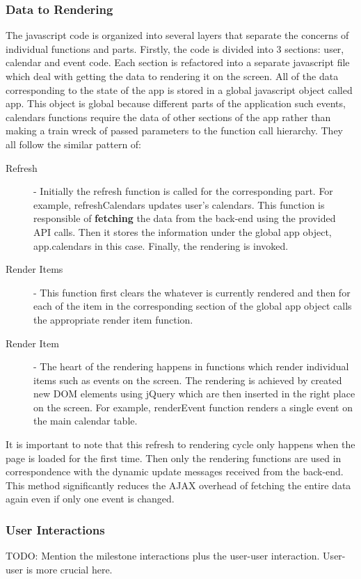 \documentclass[10pt,a4paper]{article}
\begin{document}
\subsubsection{Data to Rendering}
The javascript code is organized into several layers that separate the concerns of individual functions and parts. Firstly, the code is divided into 3 sections: user, calendar and event code. Each section is refactored into a separate javascript file which deal with getting the data to rendering it on the screen. All of the data corresponding to the state of the app is stored in a global javascript object called app. This object is global because different parts of the application such events, calendars functions require the data of other sections of the app rather than making a train wreck of passed parameters to the function call hierarchy. They all follow the similar pattern of:
\begin{description}
\item[Refresh] - Initially the refresh function is called for the corresponding part. For example, refreshCalendars updates user's calendars. This function is responsible of \textbf{fetching} the data from the back-end using the provided API calls. Then it stores the information under the global app object, app.calendars in this case. Finally, the rendering is invoked.
\item[Render Items] - This function first clears the whatever is currently rendered and then for each of the item in the corresponding section of the global app object calls the appropriate render item function.
\item[Render Item] - The heart of the rendering happens in functions which render individual items such as events on the screen. The rendering is achieved by created new DOM elements using jQuery which are then inserted in the right place on the screen. For example, renderEvent function renders a single event on the main calendar table.
\end{description}
It is important to note that this refresh to rendering cycle only happens when the page is loaded for the first time. Then only the rendering functions are used in correspondence with the dynamic update messages received from the back-end. This method significantly reduces the AJAX overhead of fetching the entire data again even if only one event is changed.

\subsubsection{User Interactions}
TODO: Mention the milestone interactions plus the user-user interaction. User-user is more crucial here.
\end{document}
